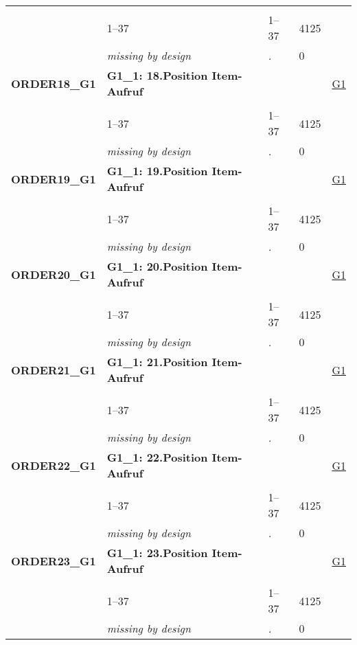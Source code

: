 \begin{longtable}{| L{2.65cm} | L{8cm} | C{1.5cm} | R{1.25cm} | C{2.25cm}  |}
   &  &  &  &  \\ 
   & 1--37 & 1--37 & 4125 &  \\ 
   & \textit{missing by design} & \textit{.} & 0 &  \\ 
   \midrule
\textbf{ORDER18\_G1}\label{var:ORDER18:G1} & \textbf{G1\_1: 18.Position Item-Aufruf} &  &  & \hyperref[G1]{G1} \\ 
   &  &  &  &  \\ 
   & 1--37 & 1--37 & 4125 &  \\ 
   & \textit{missing by design} & \textit{.} & 0 &  \\ 
   \midrule
\textbf{ORDER19\_G1}\label{var:ORDER19:G1} & \textbf{G1\_1: 19.Position Item-Aufruf} &  &  & \hyperref[G1]{G1} \\ 
   &  &  &  &  \\ 
   & 1--37 & 1--37 & 4125 &  \\ 
   & \textit{missing by design} & \textit{.} & 0 &  \\ 
   \midrule
\textbf{ORDER20\_G1}\label{var:ORDER20:G1} & \textbf{G1\_1: 20.Position Item-Aufruf} &  &  & \hyperref[G1]{G1} \\ 
   &  &  &  &  \\ 
   & 1--37 & 1--37 & 4125 &  \\ 
   & \textit{missing by design} & \textit{.} & 0 &  \\ 
   \midrule
\textbf{ORDER21\_G1}\label{var:ORDER21:G1} & \textbf{G1\_1: 21.Position Item-Aufruf} &  &  & \hyperref[G1]{G1} \\ 
   &  &  &  &  \\ 
   & 1--37 & 1--37 & 4125 &  \\ 
   & \textit{missing by design} & \textit{.} & 0 &  \\ 
   \midrule
\textbf{ORDER22\_G1}\label{var:ORDER22:G1} & \textbf{G1\_1: 22.Position Item-Aufruf} &  &  & \hyperref[G1]{G1} \\ 
   &  &  &  &  \\ 
   & 1--37 & 1--37 & 4125 &  \\ 
   & \textit{missing by design} & \textit{.} & 0 &  \\ 
   \midrule
\textbf{ORDER23\_G1}\label{var:ORDER23:G1} & \textbf{G1\_1: 23.Position Item-Aufruf} &  &  & \hyperref[G1]{G1} \\ 
   &  &  &  &  \\ 
   & 1--37 & 1--37 & 4125 &  \\ 
   & \textit{missing by design} & \textit{.} & 0 &  \\ 

\end{longtable}
